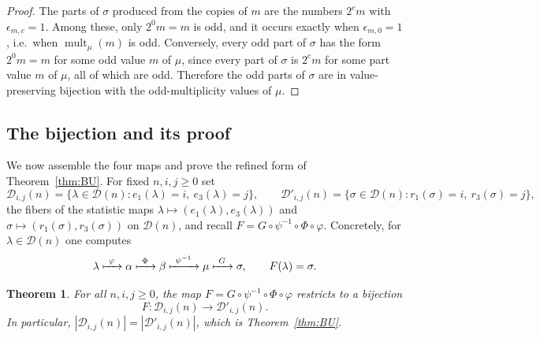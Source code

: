 \documentclass[11pt]{amsart}
\newtheorem{theorem}{Theorem}[section]
\theoremstyle{definition}
\theoremstyle{remark}
\newcommand{\D}{\mathcal D}
\newcommand{\mult}{\operatorname{mult}}
\begin{document}
\begin{proof}
The parts of $\sigma$ produced from the copies of $m$ are the numbers $2^c m$ with $\epsilon_{m,c}=1$. Among these, only $2^0m=m$ is odd, and it occurs exactly when $\epsilon_{m,0}=1$, i.e.\ when $\mult_\mu(m)$ is odd. Conversely, every odd part of $\sigma$ has the form $2^0m=m$ for some odd value $m$ of $\mu$, since every part of $\sigma$ is $2^cm$ for some part value $m$ of $\mu$, all of which are odd. Therefore the odd parts of $\sigma$ are in value-preserving bijection with the odd-multiplicity values of $\mu$.
\end{proof}

\subsection{The bijection and its proof}\label{sec:proof}
We now assemble the four maps and prove the refined form of Theorem~\ref{thm:BU}. For fixed \(n,i,j\ge0\) set
\[
   \D_{i,j}(n)=\{\lambda\in\D(n): e_1(\lambda)=i,\ e_3(\lambda)=j\},
   \qquad
   \D'_{i,j}(n)=\{\sigma\in\D(n): r_1(\sigma)=i,\ r_3(\sigma)=j\},
\]
the fibers of the statistic maps $\lambda\mapsto(e_1(\lambda),e_3(\lambda))$ and $\sigma\mapsto(r_1(\sigma),r_3(\sigma))$ on $\D(n)$,
and recall \(F=G\circ\psi^{-1}\circ\Phi\circ\varphi\). Concretely, for
\(\lambda\in\D(n)\) one computes
\[
   \lambda \xmapsto{\ \varphi\ }
   \alpha \xmapsto{\ \Phi\ }
   \beta \xmapsto{\ \psi^{-1}\ }
   \mu \xmapsto{\ G\ }
   \sigma,
   \qquad F(\lambda)=\sigma .
\]

\begin{theorem}\label{thm:main}
For all \(n,i,j\ge 0\), the map \(F=G\circ\psi^{-1}\circ\Phi\circ\varphi\)
restricts to a bijection
\[
   F:\D_{i,j}(n)\longrightarrow \D'_{i,j}(n) .
\]
In particular, \(|\D_{i,j}(n)|=|\D'_{i,j}(n)|\), which is Theorem~\ref{thm:BU}.
\end{theorem}
\end{document}
